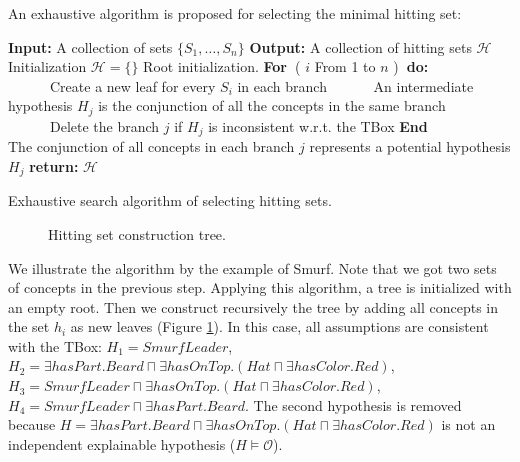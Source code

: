 \documentclass{article}
\begin{document}
An exhaustive algorithm is proposed for selecting the minimal hitting set:

\begin{algorithm}[H]
\textbf{Input:} A collection of sets $\{S_1,\dots,S_n\}$\;
\textbf{Output:} A collection of hitting sets $\mathcal{H}$\;
Initialization\:
$\mathcal{H}=\{\}$\;
Root initialization.\;
\textbf{For~}( $i$ From 1 to $n$ )\textbf{~do:}\\
~~~~~~Create a new leaf for every  $S_i$  in each branch\;
~~~~~~An intermediate hypothesis $H_{j}$ is the conjunction of all the concepts in the same branch\;
~~~~~~Delete the branch $j$ if $H_{j}$ is inconsistent w.r.t. the TBox\;
\textbf{End}\\
The conjunction of all concepts in each branch $j$ represents a potential hypothesis $H_j$\;
\textbf{return:} $\mathcal{H}$\;
\caption{Exhaustive search algorithm of selecting hitting sets.}\label{exhaustive}
\end{algorithm}


\begin{figure}
\centering
{}
\caption{Hitting set construction tree.\label{fig:hittingtree}}
\end{figure}
We illustrate the algorithm by the example of Smurf. Note that we got two sets of concepts in the previous step.
Applying this algorithm, a tree is initialized with an empty root. Then we construct recursively the tree by adding all concepts
in the set $h_i$ as new leaves (Figure \ref{fig:hittingtree}). In this case, all
assumptions are consistent with the TBox:
$H_1=SmurfLeader$, $H_2=\exists hasPart.Beard \sqcap \exists hasOnTop.(Hat\sqcap\exists hasColor.Red)$, 
$H_3=SmurfLeader\sqcap\exists hasOnTop.(Hat\sqcap \exists hasColor.Red)$, $H_4=SmurfLeader \sqcap \exists hasPart.Beard$. 
The second hypothesis is removed because $H=\exists hasPart.Beard \sqcap \exists hasOnTop.(Hat\sqcap\exists hasColor.Red)$ 
is not an independent explainable hypothesis ($H\vDash \mathcal{O}$). 
\end{document}
